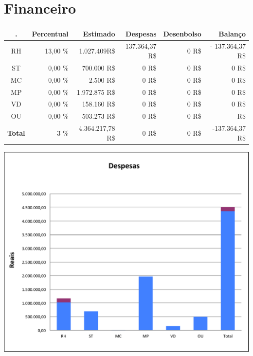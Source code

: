 



\section{Financeiro}
\label{financeiro}
\vfill
\begin{center}
    \begin{tabular}{|c|r|r|r|r||r} 
 	
	\hline
		
	{\bf .} 	&	{\bf Percentual} &	{\bf Estimado }	&		{\bf Despesas}&		{\bf Desenbolso}&		{\bf Balanço}   	\\  \hline

	RH&  13,00 \%& 1.027.409R\$& 	 	137.364,37 R\$ & 	 	0 R\$ & 	 	- 137.364,37 R\$  \\ \hline

	ST&  0,00 \%& 700.000 R\$& 	 	0 R\$& 	 	0 R\$& 	 	0 R\$ 	\\  \hline

	MC &  0,00 \%& 2.500 R\$& 	 	0 R\$& 	 	0 R\$  & 	 	0 R\$ 	\\  \hline	

	MP&  0,00 \%& 1.972.875 R\$& 	 	0 R\$& 	 	0 R\$ & 	 	0 R\$ 	\\  \hline				

	VD&  0,00 \%& 158.160 R\$& 	 	0 R\$& 	 	0 R\$ & 	 	0 R\$	\\  \hline

	OU&  0,00 \%& 503.273 R\$& 	 	0 R\$& 	 	0 R\$ & 	 	  R\$ 	 \\  \hline
	\hline
		{\bf Total} 	&  3 \%&  4.364.217,78 R\$& 	 	0 R\$ & 	 0 R\$ &	-137.364,37 R\$ 	 \\  \hline

\end{tabular}
\end{center}

\vfill

\begin{center}
  \includegraphics[width=1\columnwidth]{figs/financeiro/financeiro.pdf}
\end{center}


